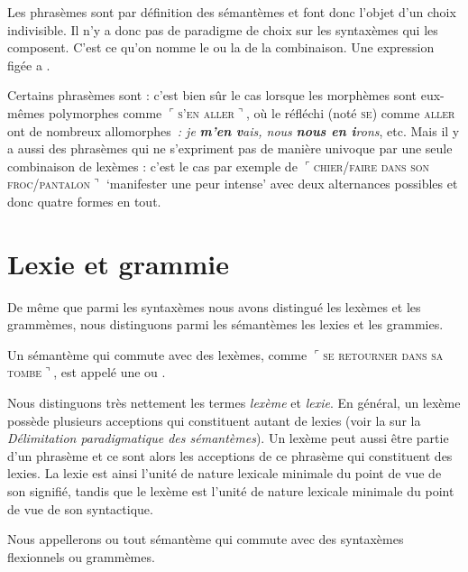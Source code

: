 Les phrasèmes sont par définition des sémantèmes et font donc l’objet d’un choix indivisible. Il n’y a donc pas de paradigme de choix sur les syntaxèmes qui les composent. C’est ce qu’on nomme le  ou la  de la combinaison. Une expression figée a .

Certains phrasèmes sont : c’est bien sûr le cas lorsque les morphèmes sont eux-mêmes polymorphes comme $⌜$\textsc{s’en} \textsc{aller}$⌝$, où le réfléchi (noté \textsc{se}) comme \textsc{aller} ont de nombreux allomorphes~\textit{: je} \textbf{\textit{m’en} \textit{v}}\textit{ais, nous} \textbf{\textit{nous en i}}\textit{rons}, etc. Mais il y a aussi des phrasèmes qui ne s’expriment pas de manière univoque par une seule combinaison de lexèmes : c’est le cas par exemple de $⌜$\textsc{chier/faire} \textsc{dans} \textsc{son} \textsc{froc/pantalon}$⌝$ ‘manifester une peur intense’ avec deux alternances possibles et donc quatre formes en tout.

\section{Lexie et grammie}\label{sec:2.3.8}

De même que parmi les syntaxèmes nous avons distingué les lexèmes et les grammèmes, nous distinguons parmi les sémantèmes les lexies et les grammies.

{Un sémantème qui commute avec des lexèmes, comme $⌜$\textsc{se} \textsc{retourner} \textsc{dans} \textsc{sa} \textsc{tombe}$⌝$, est appelé une  ou .}

Nous distinguons très nettement les termes \textit{lexème} et \textit{lexie}. En général, un lexème possède plusieurs acceptions qui constituent autant de lexies (voir la  sur la \textit{Délimitation paradigmatique des sémantèmes}). Un lexème peut aussi être partie d’un phrasème et ce sont alors les acceptions de ce phrasème qui constituent des lexies. La lexie est ainsi l’unité de nature lexicale minimale du point de vue de son signifié, tandis que le lexème est l’unité de nature lexicale minimale du point de vue de son syntactique.

{Nous appellerons  ou  tout sémantème qui commute avec des syntaxèmes flexionnels ou grammèmes.}

